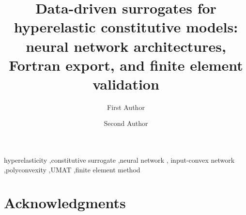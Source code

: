 \documentclass[preprint,12pt]{elsarticle}
\begin{document}
\begin{frontmatter}

\title{Data-driven surrogates for hyperelastic constitutive models:\\
  neural network architectures, Fortran export, and finite element validation}

\author[inst1]{First Author}
\author[inst1]{Second Author}


\begin{abstract}

\end{abstract}

\begin{keyword}
  hyperelasticity \sep constitutive surrogate \sep neural network \sep
  input-convex network \sep polyconvexity \sep UMAT \sep finite element method
\end{keyword}

\end{frontmatter}











\section*{Acknowledgments}




\appendix

\end{document}
